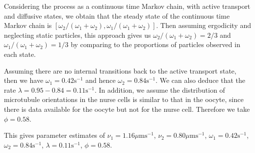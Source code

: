 \documentclass[twocolumn]{biophys}
\begin{document}
Considering the process as a continuous time Markov chain, with active transport and diffusive states, we obtain that the steady state of the continuous time Markov chain is $[\omega_2 /(\omega_1 + \omega_2), \omega_1/(\omega_1+\omega_2)]$. 
Then assuming ergodicity and neglecting static particles, this approach gives us $\omega_2 /(\omega_1 + \omega_2) = 2/3$ and $\omega_1 /(\omega_1 + \omega_2) = 1/3$ by comparing to the proportions of particles observed in each state.

Assuming there are no internal transitions back to the active transport state, then we have $\omega_1 = 0.42 \text{s}^{-1}$ and hence $\omega_2 = 0.84 \text{s}^{-1}$. 
We can also deduce that the rate $\lambda = 0.95-0.84 = 0.11 \text{s}^{-1}$.  
In addition, we assume the distribution of microtubule orientations in the nurse cells is similar to that in the oocyte, since there is data available for the oocyte \citep{parton20111} but not for the nurse cell. 
Therefore we take $\phi = 0.58$.

This gives parameter estimates of $\nu_1 = 1.16  \mu \text{ms}^{-1}$, $\nu_2 = 0.80  \mu \text{ms}^{-1}$, $\omega_1 = 0.42 \text{s}^{-1} $, $\omega_2 = 0.84 \text{s}^{-1}$, $\lambda = 0.11 \text{s}^{-1}$, $\phi = 0.58$.
\end{document}
